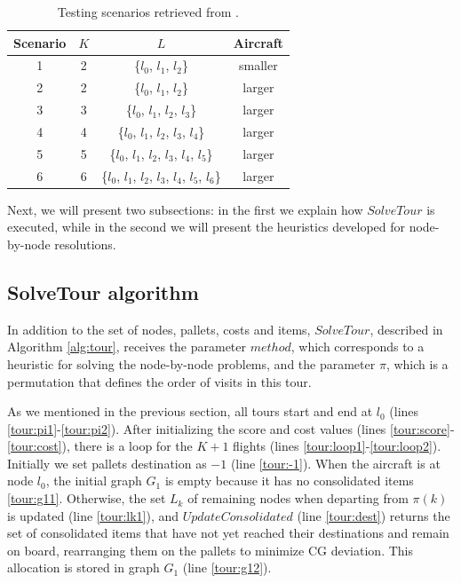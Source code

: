 \documentclass[preprint,authoryear]{elsarticle}
\begin{document}
\vspace{2.0mm}
\begin{table}[H]
	\centering
	\caption{Testing scenarios retrieved from \cite{MesquitaSanches2023}.}  \label{tab:scenarios}
	\begin{tabular}{c c c c }
		\toprule
		{\bf Scenario} & {$K$} & {$L$} & {\bf Aircraft} \\		
		\midrule
		1 & 2    & \{$l_0$, $l_1$, $l_2$\}                                 & smaller \\
		2 & 2    & \{$l_0$, $l_1$, $l_2$\}                                 & larger  \\
		3 & 3    & \{$l_0$, $l_1$, $l_2$, $l_3$\}                          & larger  \\
		4 & 4    & \{$l_0$, $l_1$, $l_2$, $l_3$, $l_4$\}                   & larger  \\
		5 & 5    & \{$l_0$, $l_1$, $l_2$, $l_3$, $l_4$, $l_5$\}            & larger  \\
		6 & 6    & \{$l_0$, $l_1$, $l_2$, $l_3$, $l_4$, $l_5$, $l_6$\}     & larger  \\
		\bottomrule
	\end{tabular}
\end{table}

Next, we will present two subsections: in the first we explain how $SolveTour$ is executed, while in the second we will present the heuristics developed for node-by-node resolutions.


\subsection{SolveTour algorithm}
\label{tour}

In addition to the set of nodes, pallets, costs and items, $SolveTour$, described in Algorithm \ref{alg:tour}, receives the parameter $method$, which corresponds to a heuristic for solving the node-by-node problems, and the parameter $\pi$, which is a permutation that defines the order of visits in this tour.

As we mentioned in the previous section, all tours start and end at $l_0$\/ (lines \ref{tour:pi1}-\ref{tour:pi2}).
After initializing the score and cost values (lines \ref{tour:score}-\ref{tour:cost}), there is a loop for the $K+1$\/ flights (lines \ref{tour:loop1}-\ref{tour:loop2}). Initially we set pallets destination as $-1$\/ (line \ref{tour:-1}). When the aircraft is at node $l_0$, the initial graph $G_1$\/ is empty because it has no consolidated items \ref{tour:g11}. Otherwise, the set $L_k$\/ of remaining nodes when departing from $\pi(k)$ is updated (line \ref{tour:lk1}), and $UpdateConsolidated$\/ (line \ref{tour:dest}) returns the set of consolidated items that have not yet reached their destinations and remain on board, rearranging them on the pallets to minimize CG deviation. This allocation is stored in graph $G_1$\/ (line \ref{tour:g12}).
\end{document}
